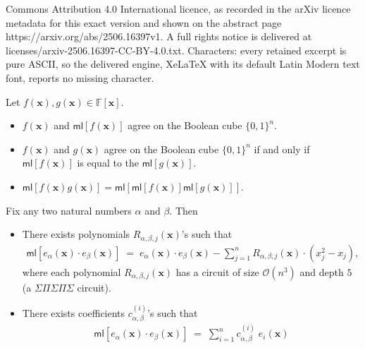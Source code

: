 \documentclass[10pt,a4paper]{amsart}
\newcommand{\Boo}{\{0,1 \}}
\newcommand{\F}{\mathbb{F}}
\newcommand{\bigO}{\mathcal{O}}
\newcommand{\ml}{\mathsf{ml}}
\begin{document}
Commons Attribution 4.0 International licence, as recorded in the arXiv licence metadata for this exact version and shown on the abstract page https://arxiv.org/abs/2506.16397v1. A full rights notice is delivered at licenses/arxiv-2506.16397-CC-BY-4.0.txt. Characters: every retained excerpt is pure ASCII, so the delivered engine, XeLaTeX with its default Latin Modern text font, reports no missing character.
\begin{fact}\label{fact:multilinear}
Let $f(\mathbf{x}), g(\mathbf{x}) \in \F[\mathbf{x}]$.
\begin{itemize}
    \item $f(\mathbf{x})$ and $\ml[f(\mathbf{x})]$ agree on the Boolean cube $\Boo^{n}$.
    \item $f(\mathbf{x})$ and $g(\mathbf{x})$ agree on the Boolean cube $\Boo^{n}$ if and only if $\ml[f(\mathbf{x})]$ is equal to the $\ml[g(\mathbf{x})]$.
    \item $\ml[f(\mathbf{x}) g(\mathbf{x})] = \ml[\ml[f(\mathbf{x})] \ml[g(\mathbf{x})]]$.
\end{itemize}
\end{fact}

\begin{lemma}\label{lemma:ml-prod-two-elem}
Fix any two natural numbers $\alpha$ and $\beta$. Then
\begin{itemize}
    \item There exists polynomials $R_{\alpha, \beta,j}(\mathbf{x})$'s such that
    \begin{align*}
        \ml[e_{\alpha}(\mathbf{x}) \cdot e_{\beta}(\mathbf{x})] \; = \; e_{\alpha}(\mathbf{x}) \cdot e_{\beta}(\mathbf{x}) - \sum_{j=1}^{n} R_{\alpha, \beta, j}(\mathbf{x}) \cdot (x_{j}^{2} - x_{j}),
    \end{align*}
    where each polynomial $R_{\alpha, \beta, j}(\mathbf{x})$ has a circuit of size $\bigO(n^{3})$ and depth $5$ (a $\Sigma \Pi \Sigma \Pi \Sigma$ circuit).
    \item There exists coefficients $c_{\alpha, \beta}^{(i)}$'s such that
    \begin{align*}
        \ml[e_{\alpha}(\mathbf{x}) \cdot e_{\beta}(\mathbf{x})] \; = \; \sum_{i = 1}^{n} c_{\alpha,\beta}^{(i)} \; e_{i}(\mathbf{x})
    \end{align*}
\end{itemize}
\end{lemma}
\end{document}
